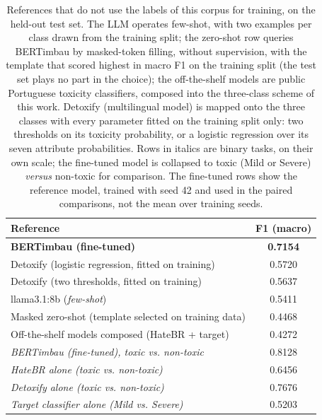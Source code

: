 \begin{table}[!t]
\centering
\caption{References that do not use the labels of this corpus for training, on the held-out test set. The LLM operates few-shot, with two examples per class drawn from the training split; the zero-shot row queries BERTimbau by masked-token filling, without supervision, with the template that scored highest in macro F1 on the training split (the test set plays no part in the choice); the off-the-shelf models are public Portuguese toxicity classifiers, composed into the three-class scheme of this work. Detoxify (multilingual model) is mapped onto the three classes with every parameter fitted on the training split only: two thresholds on its toxicity probability, or a logistic regression over its seven attribute probabilities. Rows in italics are binary tasks, on their own scale; the fine-tuned model is collapsed to toxic (Mild or Severe) \emph{versus} non-toxic for comparison. The fine-tuned rows show the reference model, trained with seed 42 and used in the paired comparisons, not the mean over training seeds.}
\label{tab:sem-finetuning}
\begin{tabular}{lc}
\toprule
Reference & F1 (macro) \\
\midrule
\textbf{BERTimbau (fine-tuned)} & \textbf{0.7154} \\
Detoxify (logistic regression, fitted on training) & 0.5720 \\
Detoxify (two thresholds, fitted on training) & 0.5637 \\
llama3.1:8b (\emph{few-shot}) & 0.5411 \\
Masked zero-shot (template selected on training data) & 0.4468 \\
Off-the-shelf models composed (HateBR + target) & 0.4272 \\
\midrule
\emph{BERTimbau (fine-tuned), toxic vs. non-toxic} & 0.8128 \\
\emph{HateBR alone (toxic vs. non-toxic)} & 0.6456 \\
\emph{Detoxify alone (toxic vs. non-toxic)} & 0.7676 \\
\emph{Target classifier alone (Mild vs. Severe)} & 0.5203 \\
\bottomrule
\end{tabular}
\end{table}
